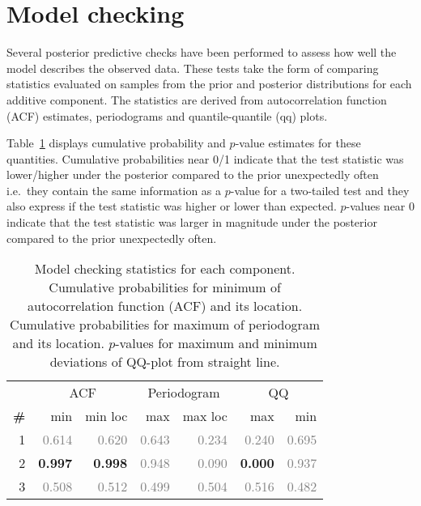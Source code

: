 \documentclass{article} %
\def\ie{i.e.\ }
\begin{document}
\section{Model checking}
\label{sec:check}

Several posterior predictive checks have been performed to assess how well the model describes the observed data.
These tests take the form of comparing statistics evaluated on samples from the prior and posterior distributions for each additive component.
The statistics are derived from autocorrelation function (ACF) estimates, periodograms and quantile-quantile (qq) plots.

Table~\ref{table:check} displays cumulative probability and $p$-value estimates for these quantities.
Cumulative probabilities near 0/1 indicate that the test statistic was lower/higher under the posterior compared to the prior unexpectedly often \ie they contain the same information as a $p$-value for a two-tailed test and they also express if the test statistic was higher or lower than expected.
$p$-values near 0 indicate that the test statistic was larger in magnitude under the posterior compared to the prior unexpectedly often.

\begin{table}[htb]
\begin{center}
{\small
\begin{tabular}{|r|rr|rr|rr|}
\hline
 & \multicolumn{2}{|c|}{ACF} & \multicolumn{2}{|c|}{Periodogram} & \multicolumn{2}{|c|}{QQ} \\
\bf{\#} & {min} & {min loc} & {max} & {max loc} & {max} & {min}\\
\hline

1 & \textcolor{gray}{0.614} & \textcolor{gray}{0.620} & \textcolor{gray}{0.643} & \textcolor{gray}{0.234} & \textcolor{gray}{0.240} & \textcolor{gray}{0.695}\\

2 & \textbf{0.997} & \textbf{0.998} & \textcolor{gray}{0.948} & \textcolor{gray}{0.090} & \textbf{0.000} & \textcolor{gray}{0.937}\\

3 & \textcolor{gray}{0.508} & \textcolor{gray}{0.512} & \textcolor{gray}{0.499} & \textcolor{gray}{0.504} & \textcolor{gray}{0.516} & \textcolor{gray}{0.482}\\

\hline
\end{tabular}
\caption{
Model checking statistics for each component.
Cumulative probabilities for minimum of autocorrelation function (ACF) and its location.
Cumulative probabilities for maximum of periodogram and its location.
$p$-values for maximum and minimum deviations of QQ-plot from straight line.
}
\label{table:check}
}
\end{center}
\end{table}
\end{document}
